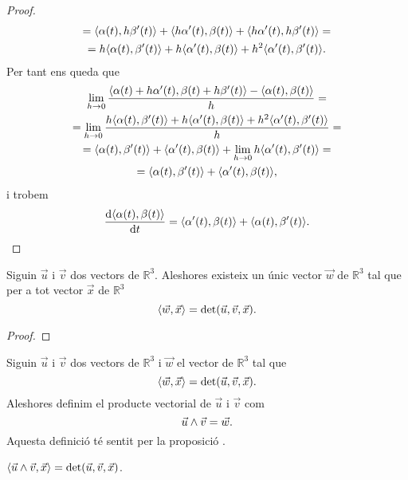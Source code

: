 \documentclass[../Apunts.tex]{subfiles}
\begin{document}
\begin{proof}
\begin{multline*}
			=\prodesc{\alpha(t)}{h\beta'(t)}+\prodesc{h\alpha'(t)}{\beta(t)}+\prodesc{h\alpha'(t)}{h\beta'(t)}=\\
			=h\prodesc{\alpha(t)}{\beta'(t)}+h\prodesc{\alpha'(t)}{\beta(t)}+h^{2}\prodesc{\alpha'(t)}{\beta'(t)}.
		\end{multline*}
		Per tant ens queda que
		\begin{multline*}
			\lim_{h\to0}\frac{\prodesc{\alpha(t)+h\alpha'(t)}{\beta(t)+h\beta'(t)}-\prodesc{\alpha(t)}{\beta(t)}}{h}=\\
			=\lim_{h\to0}\frac{h\prodesc{\alpha(t)}{\beta'(t)}+h\prodesc{\alpha'(t)}{\beta(t)}+h^{2}\prodesc{\alpha'(t)}{\beta'(t)}}{h}=\\
			=\prodesc{\alpha(t)}{\beta'(t)}+\prodesc{\alpha'(t)}{\beta(t)}+\lim_{h\to0}h\prodesc{\alpha'(t)}{\beta'(t)}=\\
			=\prodesc{\alpha(t)}{\beta'(t)}+\prodesc{\alpha'(t)}{\beta(t)},
		\end{multline*}
		i trobem
		\[\frac{\diff\prodesc{\alpha(t)}{\beta(t)}}{\diff t}=\prodesc{\alpha'(t)}{\beta(t)}+\prodesc{\alpha(t)}{\beta'(t)}.\qedhere\]
	\end{proof}
	\begin{proposition}
		\label{prop:unicitat del producte vectorial entre dos vectors}
		Siguin \(\vec{u}\) i \(\vec{v}\) dos vectors de \(\mathbb{R}^{3}\). Aleshores existeix un únic vector \(\vec{w}\) de \(\mathbb{R}^{3}\) tal que per a tot vector \(\vec{x}\) de \(\mathbb{R}^{3}\)
		\[\prodesc{\vec{w}}{\vec{x}}=\det(\vec{u},\vec{v},\vec{x}).\]
	\end{proposition}
	\begin{proof}
	\end{proof}
	\begin{definition}
		\label{def:producte vectorial}
		Siguin \(\vec{u}\) i \(\vec{v}\) dos vectors de \(\mathbb{R}^{3}\) i \(\vec{w}\) el vector de \(\mathbb{R}^{3}\) tal que
		\[\prodesc{\vec{w}}{\vec{x}}=\det(\vec{u},\vec{v},\vec{x}).\]
		Aleshores definim el producte vectorial de \(\vec{u}\) i \(\vec{v}\) com
		\[\vec{u}\mathbin{\wedge}\vec{v}=\vec{w}.\]
		Aquesta definició té sentit per la proposició .
	\end{definition}
	\begin{observation}
		\label{obs:fórmula del determinant segons el producte vectorial i el producte escalar}
		\(\prodesc{\vec{u}\prodvec\vec{v}}{\vec{x}}=\det(\vec{u},\vec{v},\vec{x})\).
	\end{observation}
\end{document}
